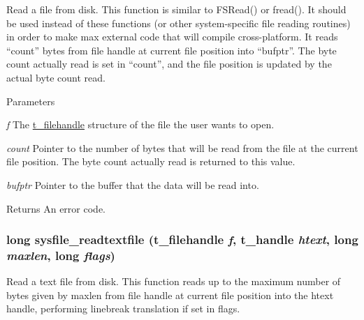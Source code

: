 Read a file from disk. This function is similar to FSRead() or fread(). It should be used instead of these functions (or other system-\/specific file reading routines) in order to make max external code that will compile cross-\/platform. It reads “count” bytes from file handle at current file position into “bufptr”. The byte count actually read is set in “count”, and the file position is updated by the actual byte count read.


\begin{DoxyParams}{Parameters}
\item[{\em f}]The \hyperlink{group__files_gafcb776aa74d514754e83b30995b5a5d1}{t\_\-filehandle} structure of the file the user wants to open. \item[{\em count}]Pointer to the number of bytes that will be read from the file at the current file position. The byte count actually read is returned to this value. \item[{\em bufptr}]Pointer to the buffer that the data will be read into. \end{DoxyParams}
\begin{DoxyReturn}{Returns}
An error code. 
\end{DoxyReturn}
\hypertarget{group__files_gabb35e28302ee972648e61f9a5a61b96a}{
\subsubsection[{sysfile\_\-readtextfile}]{\setlength{\rightskip}{0pt plus 5cm}long sysfile\_\-readtextfile ({\bf t\_\-filehandle} {\em f}, \/  {\bf t\_\-handle} {\em htext}, \/  long {\em maxlen}, \/  long {\em flags})}}
\label{group__files_gabb35e28302ee972648e61f9a5a61b96a}


Read a text file from disk. This function reads up to the maximum number of bytes given by maxlen from file handle at current file position into the htext handle, performing linebreak translation if set in flags.


